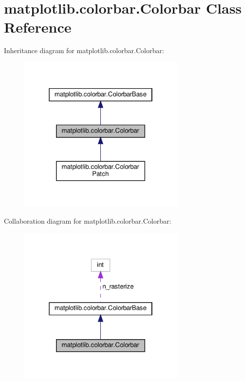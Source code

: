 \hypertarget{classmatplotlib_1_1colorbar_1_1Colorbar}{}\section{matplotlib.\+colorbar.\+Colorbar Class Reference}
\label{classmatplotlib_1_1colorbar_1_1Colorbar}


Inheritance diagram for matplotlib.\+colorbar.\+Colorbar\+:
\nopagebreak
\begin{figure}[H]
\begin{center}
\leavevmode
\includegraphics[width=238pt]{classmatplotlib_1_1colorbar_1_1Colorbar__inherit__graph}
\end{center}
\end{figure}


Collaboration diagram for matplotlib.\+colorbar.\+Colorbar\+:
\nopagebreak
\begin{figure}[H]
\begin{center}
\leavevmode
\includegraphics[width=238pt]{classmatplotlib_1_1colorbar_1_1Colorbar__coll__graph}
\end{center}
\end{figure}
